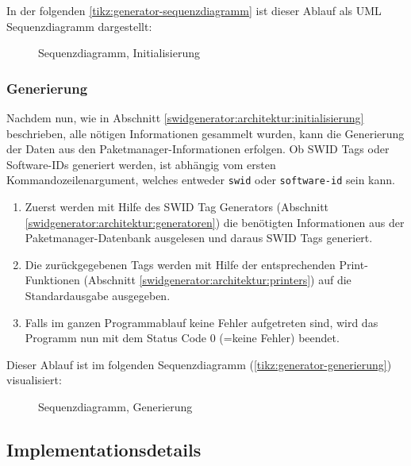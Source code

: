 In der folgenden \autoref{tikz:generator-sequenzdiagramm} ist dieser Ablauf als UML Sequenzdiagramm dargestellt:

\begin{figure}[H]
	\centering
	
	\caption{Sequenzdiagramm, Initialisierung}
	\label{tikz:generator-sequenzdiagramm}
\end{figure}

\subsubsection{Generierung}
\label{swidgenerator:architektur:generierung}

Nachdem nun, wie in Abschnitt \ref{swidgenerator:architektur:initialisierung}
beschrieben, alle nötigen Informationen gesammelt wurden, kann die Generierung
der Daten aus den Paketmanager-Informationen erfolgen. Ob SWID Tags oder
Software-IDs generiert werden, ist abhängig vom ersten Kommandozeilenargument,
welches entweder \texttt{swid} oder \texttt{software-id} sein kann.

\begin{enumerate}
	\item Zuerst werden mit Hilfe des SWID Tag Generators (Abschnitt
	\ref{swidgenerator:architektur:generatoren}) die benötigten Informationen aus
	der Paketmanager-Datenbank ausgelesen und daraus SWID Tags generiert.
		
	\item Die zurückgegebenen Tags werden mit Hilfe der entsprechenden
	Print-Funktionen (Abschnitt \ref{swidgenerator:architektur:printers}) auf die
	Standardausgabe ausgegeben.
		
	\item Falls im ganzen Programmablauf keine Fehler aufgetreten sind, wird das
	Programm nun mit dem Status Code 0 (=keine Fehler) beendet.
\end{enumerate}

Dieser Ablauf ist im folgenden Sequenzdiagramm (\autoref{tikz:generator-generierung}) visualisiert:

\begin{figure}[H]
	\centering
	
	\caption{Sequenzdiagramm, Generierung}
	\label{tikz:generator-generierung}
\end{figure}


\subsection{Implementationsdetails}

